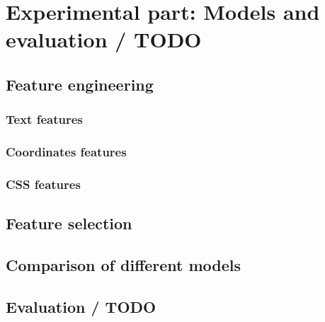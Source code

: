 \chapter{Experimental part: Models and evaluation / TODO}
\label{chap:model}
\section{Feature engineering}
\subsection{Text features}
\subsection{Coordinates features}
\subsection{CSS features}
\section{Feature selection}

\section{Comparison of different models}

\section{Evaluation / TODO}
\label{sec:eval}
